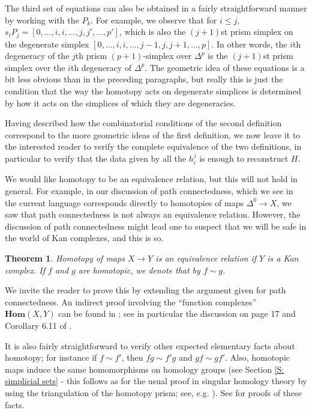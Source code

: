 \documentclass[12pt]{article}
\theoremstyle{plain}
\newtheorem{theorem}{Theorem}[section]
\theoremstyle{definition}
\theoremstyle{remark}
\newcommand{\Homs}{\textbf{Hom}}
\begin{document}
The third set of equations can also be obtained in a fairly straightforward manner by working with the $P_k$. For example, we observe that for $i\leq j$, $s_iP_j=[0,\ldots,i,i,\ldots,j,j',\ldots,p']$, which is also the $(j+1)$st prism simplex on the degenerate simplex $[0,\ldots,i,i,\ldots,j-1,j,j+1,\ldots,p]$. In other words, the $i$th degeneracy of the $j$th prism $(p+1)$-simplex over $\Delta^p$ is the $(j+1)$st prism simplex over the $i$th degeneracy of $\Delta^p$. 
The geometric idea of these equations is a bit less obvious than in the preceding paragraphs, but really this is just the condition that the way the homotopy acts on degenerate simplices is determined by how it acts on the simplices of which they are degeneracies. 

Having described how the combinatorial conditions of the second definition correspond to the more geometric ideas of the first definition, we now leave it to the interested reader to verify the complete equivalence of the two definitions, in particular to verify that the data given by all the $h_i^j$ is enough to reconstruct $H$.

\smallskip

We would like  homotopy to be an equivalence relation, but this will not hold in general. For example, in our discussion of path connectedness, which we see in the current language corresponds directly to homotopies of maps $\Delta^0\to X$, we saw that path connectedness is not always an equivalence relation. However, the discussion of path connectedness might lead one to suspect that we will be safe in the world of Kan complexes, and this is so.

\begin{theorem}
Homotopy of maps $X\to Y$ is an equivalence relation if $Y$ is a Kan complex. If $f$ and $g$ are homotopic, we denote that by $f\sim g$. 
\end{theorem}

We invite the reader to prove this by extending the argument given for path connectedness. An indirect proof involving the  ``function complexes'' $\Homs(X,Y)$ can be found in \cite{MAY67}; see in particular the discussion on page 17 and Corollary 6.11 of \cite{MAY67}. 

It is also fairly straightforward to verify other expected elementary facts about homotopy; for instance if $f\sim f'$, then $fg\sim f'g$ and $gf\sim gf'$. Also, homotopic maps induce the same homomorphisms on homology groups (see Section \ref{S: simplicial sets} - this follows as for the usual proof in singular homology theory by using the triangulation of the homotopy prism; see, e.g. \cite{MK}). See \cite[Section I.5]{MAY67} for proofs of these facts. 
\end{document}
